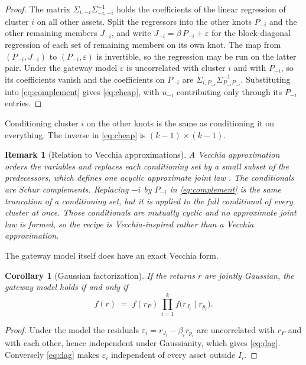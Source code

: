 \documentclass[11pt]{article}
\newtheorem{remark}{Remark}
\newtheorem{corollary}{Corollary}
\begin{document}
\begin{proof}
The matrix $\Sigma_{i,-i}\Sigma_{-i,-i}^{-1}$ holds the coefficients of the
linear regression of cluster $i$ on all other assets. Split the regressors
into the other knots $P_{-i}$ and the other remaining members $J_{-i}$, and write
$J_{-i}=\beta\,P_{-i}+\varepsilon$ for the block-diagonal regression of
each set of remaining members on its own knot. The map from $(P_{-i},J_{-i})$ to
$(P_{-i},\varepsilon)$ is invertible, so the regression may be run on the
latter pair. Under the gateway model $\varepsilon$ is uncorrelated with
cluster $i$ and with $P_{-i}$, so its coefficients vanish and the
coefficients on $P_{-i}$ are $\Sigma_{i,P_{-i}}\Sigma_{P_{-i}P_{-i}}^{-1}$.
Substituting into \eqref{eq:complement} gives \eqref{eq:cheap}, with
$u_{-i}$ contributing only through its $P_{-i}$ entries.
\end{proof}

Conditioning cluster $i$ on the other knots is the same as conditioning it
on everything. The inverse in \eqref{eq:cheap} is $(k-1)\times(k-1)$.

\begin{remark}[Relation to Vecchia approximations]
A Vecchia approximation orders the variables and replaces each conditioning
set by a small subset of the predecessors, which defines one acyclic
approximate joint law \parencite{vecchia1988,katzfuss2021}. The conditionals
are Schur complements. Replacing $-i$ by $P_{-i}$ in \eqref{eq:complement}
is the same truncation of a conditioning set, but it is applied to the full
conditional of every cluster at once. Those conditionals are mutually
cyclic and no approximate joint law is formed, so the recipe is
Vecchia-inspired rather than a Vecchia approximation.
\end{remark}

The gateway model itself does have an exact Vecchia form.

\begin{corollary}[Gaussian factorization]
\label{cor:gaussian}
If the returns $r$ are jointly Gaussian, the gateway model holds if and only
if
\begin{equation}
  f(r) \;=\; f(r_P)\,\prod_{i=1}^{k} f\big(r_{J_i}\mid r_{p_i}\big).
  \label{eq:dag}
\end{equation}
\end{corollary}

\begin{proof}
Under the model the residuals $\varepsilon_i=r_{J_i}-\beta_ir_{p_i}$ are
uncorrelated with $r_P$ and with each other, hence independent under
Gaussianity, which gives \eqref{eq:dag}. Conversely \eqref{eq:dag} makes
$\varepsilon_i$ independent of every asset outside $I_i$.
\end{proof}
\end{document}
